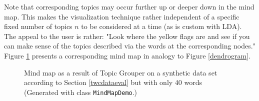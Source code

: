 \documentclass[10pt, a4paper, oneside]{article}
\begin{document}
Note that corresponding topics may occur further up or deeper down in the mind map. This makes the visualization technique rather independent of a specific fixed number of topics $n$ to be considered at a time (as is custom with LDA). The appeal to the user is rather: "Look where the yellow flags are and see if you can make sense of the topics described via the words at the corresponding nodes."
Figure \ref{mindmap1} presents a corresponding mind map in analogy to Figure \ref{dendrogram}.

\begin{figure}
\caption{Mind map as a result of Topic Grouper on a synthetic data set according to Section \ref{twcdataeval} but with only 40 words (Generated with class \texttt{MindMapDemo}.)}
\label{mindmap1}
\end{figure}
\end{document}
